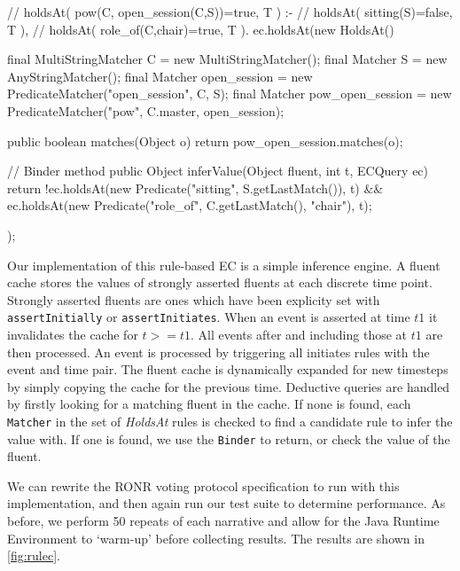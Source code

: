 \begin{java}[label=lst:holdsAt,caption={[Example of \emph{holdsAt} rule]Example of \emph{holdsAt} rule. The \texttt{matches} function filters fluents which match the form we are looking for. If the fluent matches, \texttt{inferValue} determines the value based on the status of other fluents and using matched values from the specified fluent. A \texttt{MultiStringMatcher} is used to match multiple strings in an expression against to a `master' string, which is also bound during expression parsing. This is used to unify the C variable in this example.}]
// holdsAt( pow(C, open_session(C,S))=true, T ) :-
//    holdsAt( sitting(S)=false, T ),
//    holdsAt( role_of(C,chair)=true, T ).
ec.holdsAt(new HoldsAt() {
	final MultiStringMatcher C = new MultiStringMatcher();
	final Matcher S = new AnyStringMatcher();
	final Matcher open_session = new PredicateMatcher("open_session",
			C, S);
	final Matcher pow_open_session = new PredicateMatcher("pow",
			C.master, open_session);

	public boolean matches(Object o) {
				return pow_open_session.matches(o);
			}

	// Binder method
	public Object inferValue(Object fluent, int t, ECQuery ec) {
		return !ec.holdsAt(new Predicate("sitting", S.getLastMatch()), t)
				&& ec.holdsAt(new Predicate("role_of",
						C.getLastMatch(), "chair"), t);
	}
});
\end{java}

Our implementation of this rule-based \ac{EC} is a simple inference
engine. A fluent cache stores the values of strongly asserted fluents at each
discrete time point. Strongly asserted fluents are ones which have been
explicity set with \texttt{assertInitially} or \texttt{assertInitiates}. When
an event is asserted at time $\mathit{t1}$ it invalidates the cache for $t >= \mathit{t1}$. All
events after and including those at $\mathit{t1}$ are then processed. An event is
processed by triggering all initiates rules with the event and time pair. The
fluent cache is dynamically expanded for new timesteps by simply copying the
cache for the previous time. Deductive queries are handled by firstly looking
for a matching fluent in the cache. If none is found, each \texttt{Matcher} in
the set of \emph{HoldsAt} rules is checked to find a candidate rule to infer the value
with. If one is found, we use the \texttt{Binder} to return, or check the value
of the fluent.

We can rewrite the \ac{RONR} voting protocol specification to run with this implementation,
and then again run our test suite to determine performance. As before, we
perform 50 repeats of each narrative and allow for the Java Runtime
Environment to `warm-up' before collecting results. The results are shown in \autoref{fig:rulec}.

